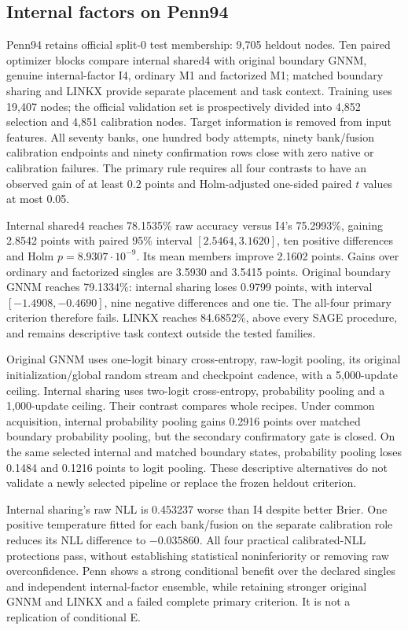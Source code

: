 \subsection{Internal factors on Penn94}\label{sec:penn}
Penn94 retains official split-0 test membership: 9,705 heldout nodes. Ten paired optimizer blocks compare internal shared4 with original boundary GNNM, genuine internal-factor I4, ordinary M1 and factorized M1; matched boundary sharing and LINKX provide separate placement and task context. Training uses 19,407 nodes; the official validation set is prospectively divided into 4,852 selection and 4,851 calibration nodes. Target information is removed from input features. All seventy banks, one hundred body attempts, ninety bank/fusion calibration endpoints and ninety confirmation rows close with zero native or calibration failures. The primary rule requires all four contrasts to have an observed gain of at least 0.2 points and Holm-adjusted one-sided paired $t$ values at most 0.05.

Internal shared4 reaches 78.1535\% raw accuracy versus I4's 75.2993\%, gaining 2.8542 points with paired 95\% interval $[2.5464,3.1620]$, ten positive differences and Holm $p=8.9307\cdot10^{-9}$. Its mean members improve 2.1602 points. Gains over ordinary and factorized singles are 3.5930 and 3.5415 points. Original boundary GNNM reaches 79.1334\%: internal sharing loses 0.9799 points, with interval $[-1.4908,-0.4690]$, nine negative differences and one tie. The all-four primary criterion therefore fails. LINKX reaches 84.6852\%, above every SAGE procedure, and remains descriptive task context outside the tested families.

Original GNNM uses one-logit binary cross-entropy, raw-logit pooling, its original initialization/global random stream and checkpoint cadence, with a 5,000-update ceiling. Internal sharing uses two-logit cross-entropy, probability pooling and a 1,000-update ceiling. Their contrast compares whole recipes. Under common acquisition, internal probability pooling gains 0.2916 points over matched boundary probability pooling, but the secondary confirmatory gate is closed. On the same selected internal and matched boundary states, probability pooling loses 0.1484 and 0.1216 points to logit pooling. These descriptive alternatives do not validate a newly selected pipeline or replace the frozen heldout criterion.

Internal sharing's raw NLL is 0.453237 worse than I4 despite better Brier. One positive temperature fitted for each bank/fusion on the separate calibration role reduces its NLL difference to $-0.035860$. All four practical calibrated-NLL protections pass, without establishing statistical noninferiority or removing raw overconfidence. Penn shows a strong conditional benefit over the declared singles and independent internal-factor ensemble, while retaining stronger original GNNM and LINKX and a failed complete primary criterion. It is not a replication of conditional E.
